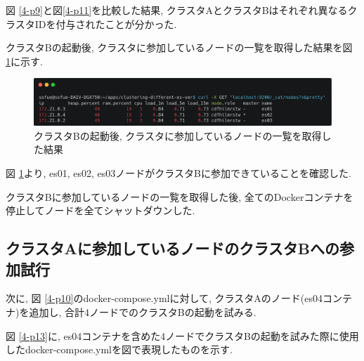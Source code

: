 図 \ref{4-p9}と図\ref{4-p11}を比較した結果, クラスタAとクラスタBはそれぞれ異なるクラスタIDを付与されたことが分かった.

クラスタBの起動後, クラスタに参加しているノードの一覧を取得した結果を図 \ref{4-p12}に示す.

\begin{figure}[H]
  \begin{center}
    \includegraphics[width=140mm]{sotu/figure/3nodes-list.png}
    \caption{クラスタBの起動後, クラスタに参加しているノードの一覧を取得した結果}
    \label{4-p12}
  \end{center}
\end{figure}

図 \ref{4-p12}より, es01, es02, es03ノードがクラスタBに参加できていることを確認した.

クラスタBに参加しているノードの一覧を取得した後, 全てのDockerコンテナを停止してノードを全てシャットダウンした.

\subsection{クラスタAに参加しているノードのクラスタBへの参加試行}

次に, 図 \ref{4-p10}のdocker-compose.ymlに対して, クラスタAのノード(es04コンテナ)を追加し, 合計4ノードでのクラスタBの起動を試みる.

図 \ref{4-p13}に, es04コンテナを含めた4ノードでクラスタBの起動を試みた際に使用したdocker-compose.ymlを図で表現したものを示す.

